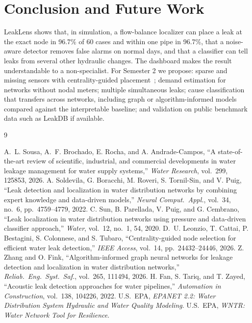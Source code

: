 \documentclass[11pt,a4paper]{article}
\begin{document}
\section{Conclusion and Future Work}
LeakLens shows that, in simulation, a flow-balance localizer can place a leak at the exact node in 96.7\% of 60 cases and within one pipe in 96.7\%, that a noise-aware detector removes false alarms on normal days, and that a classifier can tell leaks from several other hydraulic changes. The dashboard makes the result understandable to a non-specialist. For Semester 2 we propose: sparse and missing sensors with centrality-guided placement~\cite{leonzio2026centrality}; demand estimation for networks without nodal meters; multiple simultaneous leaks; cause classification that transfers across networks, including graph or algorithm-informed models~\cite{zhang2026aignn} compared against the interpretable baseline; and validation on public benchmark data such as LeakDB if available.

\begingroup\footnotesize
\begin{thebibliography}{9}
\raggedright
{} A.~L. Sousa, A.~F. Brochado, E. Rocha, and A. Andrade-Campos, ``A state-of-the-art review of scientific, industrial, and commercial developments in water leakage management for water supply systems,'' \emph{Water Research}, vol.~299, 125853, 2026.
 A. Soldevila, G. Boracchi, M. Roveri, S. Tornil-Sin, and V. Puig, ``Leak detection and localization in water distribution networks by combining expert knowledge and data-driven models,'' \emph{Neural Comput.\ Appl.}, vol.~34, no.~6, pp.~4759--4779, 2022.
 C. Sun, B. Parellada, V. Puig, and G. Cembrano, ``Leak localization in water distribution networks using pressure and data-driven classifier approach,'' \emph{Water}, vol.~12, no.~1, 54, 2020.
 D.~U. Leonzio, T. Cattai, P. Bestagini, S. Colonnese, and S. Tubaro, ``Centrality-guided node selection for efficient water leak detection,'' \emph{IEEE Access}, vol.~14, pp.~24432--24446, 2026.
 Z. Zhang and O. Fink, ``Algorithm-informed graph neural networks for leakage detection and localization in water distribution networks,'' \emph{Reliab.\ Eng.\ Syst.\ Saf.}, vol.~265, 111494, 2026.
 H. Fan, S. Tariq, and T. Zayed, ``Acoustic leak detection approaches for water pipelines,'' \emph{Automation in Construction}, vol.~138, 104226, 2022.
 U.S.\ EPA, \emph{EPANET 2.2: Water Distribution System Hydraulic and Water Quality Modeling}.
 U.S.\ EPA, \emph{WNTR: Water Network Tool for Resilience}.
\end{thebibliography}
\endgroup
\end{document}
